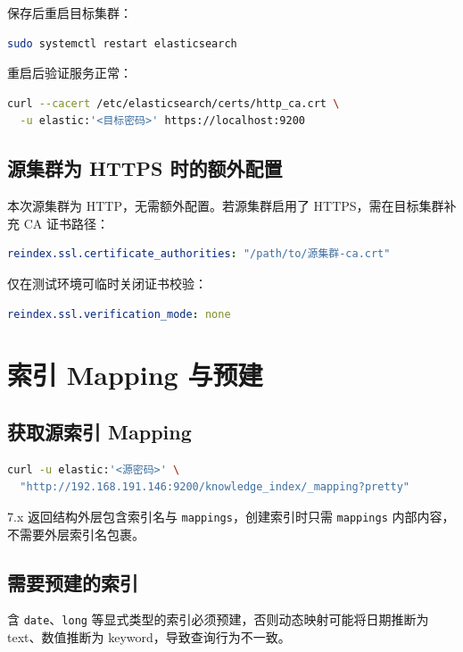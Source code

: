 \documentclass[11pt,a4paper,openany]{ctexbook}
\begin{document}
保存后重启目标集群：

\begin{lstlisting}[language=bash]
sudo systemctl restart elasticsearch
\end{lstlisting}

重启后验证服务正常：

\begin{lstlisting}[language=bash]
curl --cacert /etc/elasticsearch/certs/http_ca.crt \
  -u elastic:'<目标密码>' https://localhost:9200
\end{lstlisting}

\section{源集群为 HTTPS 时的额外配置}

本次源集群为 HTTP，无需额外配置。若源集群启用了 HTTPS，需在目标集群补充 CA 证书路径：

\begin{lstlisting}[language=yaml]
reindex.ssl.certificate_authorities: "/path/to/源集群-ca.crt"
\end{lstlisting}

仅在测试环境可临时关闭证书校验：

\begin{lstlisting}[language=yaml]
reindex.ssl.verification_mode: none
\end{lstlisting}

\chapter{索引 Mapping 与预建}

\section{获取源索引 Mapping}

\begin{lstlisting}[language=bash]
curl -u elastic:'<源密码>' \
  "http://192.168.191.146:9200/knowledge_index/_mapping?pretty"
\end{lstlisting}

7.x 返回结构外层包含索引名与 \texttt{mappings}，创建索引时只需 \texttt{mappings} 内部内容，不需要外层索引名包裹。

\section{需要预建的索引}

含 \texttt{date}、\texttt{long} 等显式类型的索引必须预建，否则动态映射可能将日期推断为 text、数值推断为 keyword，导致查询行为不一致。
\end{document}
